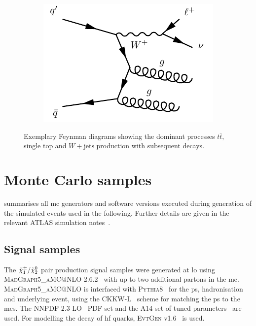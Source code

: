 \begin{figure}
\begin{subfigure}[b]{0.3\linewidth}
	\end{subfigure}\quad
	\begin{subfigure}[b]{0.3\linewidth}
		\centering\includegraphics[width=\textwidth]{wjets}
		\caption{\label{fig:wjets}}
	\end{subfigure}
	\caption{Exemplary Feynman diagrams showing the dominant processes  $t\bar{t}$,  single top and  $W+\textrm{jets}$ production with subsequent decays.}
	\label{fig:sm_backgrounds_feynman}
\end{figure}


\section{Monte Carlo samples}

 summarises all \gls{mc} generators and software versions executed during generation of the simulated events used in the following. Further details are given in the relevant ATLAS simulation notes~\cite{ATL-PHYS-PUB-2018-009,ATL-PHYS-PUB-2016-005,ATL-PHYS-PUB-2017-006,ATL-PHYS-PUB-2017-005}.

\subsection{Signal samples}\label{sec:signal_samples}

The $\tilde{\chi}_1^\pm/\tilde{\chi}_2^0$ pair production signal samples were generated at \gls{lo} using \textsc{MadGraph5\_aMC@NLO} 2.6.2~\cite{MGaMCNLO:2014hca,Frederix:2012ps} with up to two additional partons in the \gls{me}. \textsc{MadGraph5\_aMC@NLO} is interfaced with \textsc{Pythia8}~\cite{Pythia8:2007gs} for the \gls{ps}, hadronisation and underlying event, using the CKKW-L~\cite{Lonnblad:2011xx} scheme for matching the \gls{ps} to the \glspl{me}. The NNPDF 2.3 LO~\cite{Ball:2012cx} \gls{PDF} set and the A14 set of tuned parameters~\cite{ATL-PHYS-PUB-2014-021} are used. For modelling the decay of \gls{hf} quarks, \textsc{EvtGen} v1.6~\cite{Lange:2001uf} is used. 

